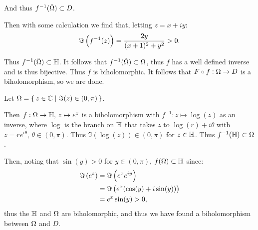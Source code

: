 \begin{example}
And thus $f^{-1} (\Tilde{\Omega}) \subset D$.

Then with some calculation we find that, letting $z=x+iy$:
\begin{align*}
    \Im \left( f^{-1}(z) \right) = \frac{2y}{(x+1)^2 + y^2} > 0.
\end{align*}

Thus $f^{-1} (\Tilde{\Omega}) \subset \mathbb{H}$. It follows that $f^{-1} (\Tilde{\Omega}) \subset \Omega$, thus $f$ has a well defined inverse and is thus bijective. Thus $f$ is biholomorphic. It follows that $F \circ f :\Omega \to D$ is a biholomorphism, so we are done.
\end{example}

\begin{example}

Let $\Omega = \set{z \in \mathbb{C}\mid \Im(z) \in (0, \pi) }$.

\begin{center}
\end{center}

Then $f: \Omega \to \mathbb{H}, \, z \mapsto e^z$ is a biholomorphism with $f^{-1} : z \mapsto \log(z)$ as an inverse, where $\log$ is the branch on $\mathbb{H}$ that takes $z$ to $\log(r) + i \theta$ with $ z = re^{i \theta}, \, \theta \in (0, \pi)$. Thus $\Im (\log(z)) \in (0, \pi)$ for $z \in \mathbb{H}$. Thus $f^{-1} (\mathbb{H}) \subset \Omega$.

Then, noting that $\sin(y) > 0$ for $y \in (0,\pi)$, $f(\Omega) \subset \mathbb{H}$ since:
\begin{align*}
    \Im \left( e^z \right) &= \Im \left( e^x e^{iy} \right)\\
    &= \Im \left( e^x(\cos(y) + i \sin(y)) \right)\\
    &= e^x \sin(y) > 0,
\end{align*}
thus the $\mathbb{H}$ and $\Omega$ are biholomorphic, and thus we have found a biholomorphism between $\Omega$ and $D$.

\end{example}

